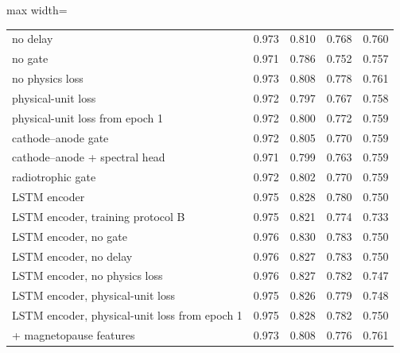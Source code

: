 \begin{table}[!t]
\begin{adjustbox}{max width=\linewidth}
\begin{tabular}{lcccc}
\quad no delay & 0.973 & 0.810 & 0.768 & 0.760 \\
\quad no gate & 0.971 & 0.786 & 0.752 & 0.757 \\
\quad no physics loss & 0.973 & 0.808 & 0.778 & 0.761 \\
\quad physical-unit loss & 0.972 & 0.797 & 0.767 & 0.758 \\
\quad physical-unit loss from epoch 1 & 0.972 & 0.800 & 0.772 & 0.759 \\
\quad cathode--anode gate & 0.972 & 0.805 & 0.770 & 0.759 \\
\quad cathode--anode + spectral head & 0.971 & 0.799 & 0.763 & 0.759 \\
\quad radiotrophic gate & 0.972 & 0.802 & 0.770 & 0.759 \\
\quad LSTM encoder & 0.975 & 0.828 & 0.780 & 0.750 \\
\quad LSTM encoder, training protocol B & 0.975 & 0.821 & 0.774 & 0.733 \\
\quad LSTM encoder, no gate & 0.976 & 0.830 & 0.783 & 0.750 \\
\quad LSTM encoder, no delay & 0.976 & 0.827 & 0.783 & 0.750 \\
\quad LSTM encoder, no physics loss & 0.976 & 0.827 & 0.782 & 0.747 \\
\quad LSTM encoder, physical-unit loss & 0.975 & 0.826 & 0.779 & 0.748 \\
\quad LSTM encoder, physical-unit loss from epoch 1 & 0.975 & 0.828 & 0.782 & 0.750 \\
\quad + magnetopause features & 0.973 & 0.808 & 0.776 & 0.761 \\
\bottomrule
\end{tabular}
\end{adjustbox}

\end{table}
